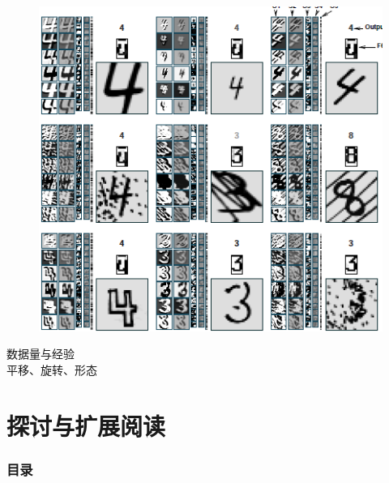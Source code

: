 \documentclass{beamer}%
\begin{document}
\begin{frame}
\begin{figure}
   \vspace{-0.2cm}  %
   \setlength{\belowcaptionskip}{-0.4cm}   %
   \setlength{\abovecaptionskip}{0.4cm}   %
  \centering%
    \hspace{0.05cm}\includegraphics[width=0.7\linewidth]{UnusualDistortionNoises.png}%
\label{fig:fastdata}
\end{figure}

\vspace{0.2cm}

数据量与经验\\
平移、旋转、形态


\end{frame}




\section{探讨与扩展阅读}
\begin{frame}[allowframebreaks]
  \frametitle{\textsc{目录}} \vspace{-0.3cm}
    \begin{spacing}{0.0}
    \end{spacing}   %
\end{frame}
\end{document}
